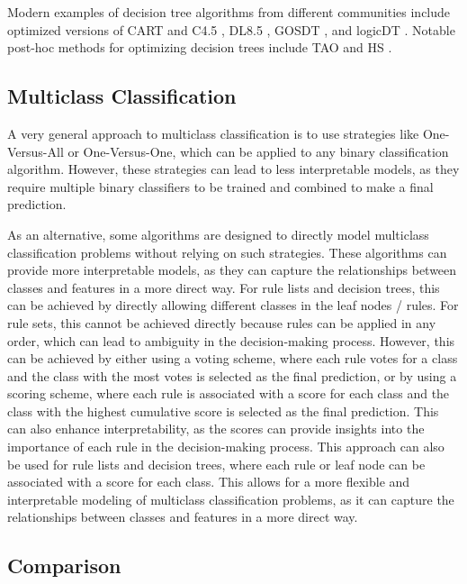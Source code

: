 \documentclass[a4paper,twoside]{article}
\begin{document}
Modern examples of decision tree algorithms from different communities include
optimized versions of CART \citep{Breiman1984} and C4.5 \citep{quinlan1993}, DL8.5 \citep{Aglin_Nijssen_Schaus_2020}, GOSDT \citep{lin2022generalizedscalableoptimalsparse}, and logicDT \citep{lau_logicdt_2024}. Notable post-hoc methods for optimizing decision trees include TAO \citep{NEURIPS2018_185c29dc} and HS \citep{pmlr-v162-agarwal22b}.

\subsection{Multiclass Classification}

A very general approach to multiclass classification is to use strategies like One-Versus-All or One-Versus-One, which can be applied to any binary classification algorithm. However, these strategies can lead to less interpretable models, as they require multiple binary classifiers to be trained and combined to make a final prediction.

As an alternative, some algorithms are designed to directly model multiclass classification problems without relying on such strategies. These algorithms can provide more interpretable models, as they can capture the relationships between classes and features in a more direct way. For rule lists and decision trees, this can be achieved by directly allowing different classes in the leaf nodes / rules. For rule sets, this cannot be achieved directly because rules can be applied in any order, which can lead to ambiguity in the decision-making process. However, this can be achieved by either using a voting scheme, where each rule votes for a class and the class with the most votes is selected as the final prediction, or by using a scoring scheme, where each rule is associated with a score for each class and the class with the highest cumulative score is selected as the final prediction. This can also enhance interpretability, as the scores can provide insights into the importance of each rule in the decision-making process. This approach can also be used for rule lists and decision trees, where each rule or leaf node can be associated with a score for each class. This allows for a more flexible and interpretable modeling of multiclass classification problems, as it can capture the relationships between classes and features in a more direct way.

\subsection{Comparison}
\end{document}
